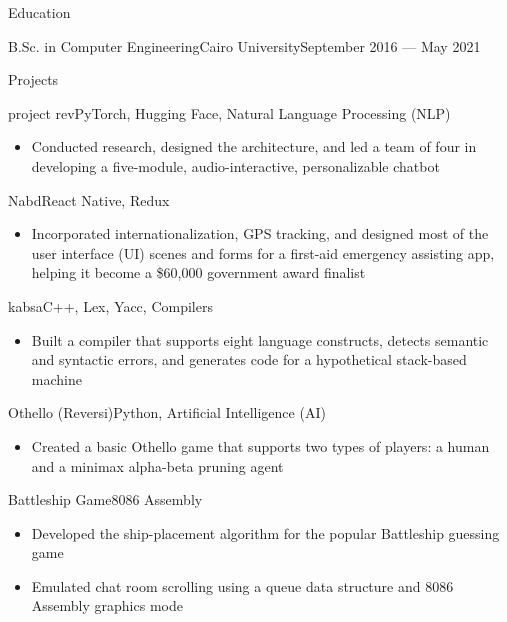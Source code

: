 \documentclass[]{mcdowellcv}
\begin{document}
	\begin{cvsection}{Education}
		\begin{cvsubsection}{B.Sc. in Computer Engineering}{Cairo University}{September 2016 — May 2021}\end{cvsubsection}
	\end{cvsection}
	\vspace*{-12pt}
	
	\begin{cvsection}{Projects}
		\begin{cvsubsection}{project rev}{}{PyTorch, Hugging Face, Natural Language Processing (NLP)}
			\begin{itemize}
				\item Conducted research, designed the architecture, and led a team of four in developing a five-module, audio-interactive, personalizable chatbot
			\end{itemize}
		\end{cvsubsection}
		\begin{cvsubsection}{Nabd}{}{React Native, Redux}
			\begin{itemize}
				\item Incorporated internationalization, GPS tracking, and designed most of the user interface (UI) scenes and forms for a first-aid emergency assisting app, helping it become a \$60,000 government award finalist
			\end{itemize}
		\end{cvsubsection}
		\begin{cvsubsection}{kabsa}{}{C++, Lex, Yacc, Compilers}
			\begin{itemize}
				\item Built a compiler that supports eight language constructs, detects semantic and syntactic errors, and generates code for a hypothetical stack-based machine
			\end{itemize}
		\end{cvsubsection}
		\begin{cvsubsection}{Othello (Reversi)}{}{Python, Artificial Intelligence (AI)}
			\begin{itemize}
				\item Created a basic Othello game that supports two types of players: a human and a minimax alpha-beta pruning agent
			\end{itemize}
		\end{cvsubsection}
		\begin{cvsubsection}{Battleship Game}{}{8086 Assembly}
			\begin{itemize}
				\item Developed the ship-placement algorithm for the popular Battleship guessing game
				\item Emulated chat room scrolling using a queue data structure and 8086 Assembly graphics mode
			\end{itemize}
		\end{cvsubsection}
	\end{cvsection}
	
\end{document}
